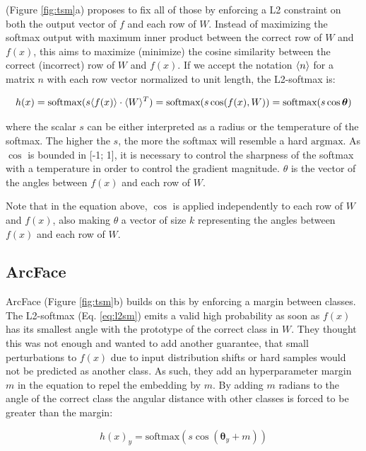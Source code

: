 \citet{l2softmax} (Figure \ref{fig:tsm}a) proposes to fix all of those by enforcing a L2 constraint on both the output vector of $f$ and each row of $W$. Instead of maximizing the softmax output with maximum inner product between the correct row of $W$ and $f(x)$, this aims to maximize (minimize) the cosine similarity between the correct (incorrect) row of $W$ and $f(x)$. If we accept the notation $\langle n \rangle$ for a matrix $n$ with each row vector normalized to unit length, the L2-softmax is:

\begin{equation}
    \label{eq:l2sm}
    h(x) = \text{softmax}(s \langle f(x) \rangle \cdot \langle W \rangle^T ) = \text{softmax}(s \cos(f(x), W)) = \text{softmax}(s \cos \boldsymbol{\theta})
\end{equation}

where the scalar $s$ can be either interpreted as a radius or the temperature of the softmax. The higher the $s$, the more the softmax will resemble a hard $\text{argmax}$. As $\cos$ is bounded in [-1; 1], it is necessary to control the sharpness of the softmax with a temperature in order to control the gradient magnitude. $\theta$ is the vector of the angles between $f(x)$ and each row of $W$.

Note that in the equation above, $\cos$ is applied independently to each row of $W$ and $f(x)$, also making $\theta$ a vector of size $k$ representing the angles between $f(x)$ and each row of $W$.

\subsection{ArcFace}


ArcFace \cite{arcface} (Figure \ref{fig:tsm}b) builds on this by enforcing a margin between classes. The L2-softmax (Eq. \ref{eq:l2sm}) emits a valid high probability as soon as $f(x)$ has its smallest angle with the prototype of the correct class in $W$. They thought this was not enough and wanted to add another guarantee, that small perturbations to $f(x)$ due to input distribution shifts or hard samples would not be predicted as another class. As such, they add an hyperparameter margin $m$ in the equation to repel the embedding by $m$. By adding $m$ radians to the angle of the correct class the angular distance with other classes is forced to be greater than the margin:

\begin{equation}
    h(x)_y = \text{softmax}(s \cos(\boldsymbol{\theta}_{y} + m))
\end{equation}

